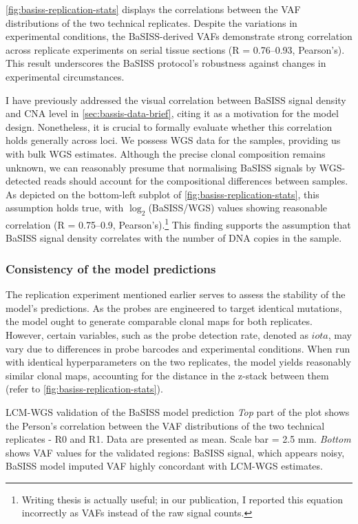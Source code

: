 \cref{fig:basiss-replication-stats} displays the correlations between the \ac{VAF} distributions of the two technical replicates. Despite the variations in experimental conditions, the \ac{BaSISS}-derived \ac{VAF}s demonstrate strong correlation across replicate experiments on serial tissue sections (R = 0.76–0.93, Pearson's). This result underscores the \ac{BaSISS} protocol's robustness against changes in experimental circumstances.

I have previously addressed the visual correlation between \ac{BaSISS} signal density and \ac{CNA} level in \cref{sec:bassis-data-brief}, citing it as a motivation for the model design. Nonetheless, it is crucial to formally evaluate whether this correlation holds generally across loci. We possess \ac{WGS} data for the samples, providing us with bulk \ac{WGS} estimates. Although the precise clonal composition remains unknown, we can reasonably presume that normalising \ac{BaSISS} signals by \ac{WGS}-detected reads should account for the compositional differences between samples. As depicted on the bottom-left subplot of \cref{fig:basiss-replication-stats}, this assumption holds true, with $\log_2$(BaSISS/WGS) values showing reasonable correlation (R = 0.75–0.9, Pearson’s).\footnote{Writing thesis is actually useful; in our publication, I reported this equation incorrectly as \ac{VAF}s instead of the raw signal counts.} This finding supports the assumption that \ac{BaSISS} signal density correlates with the number of DNA copies in the sample.

\subsubsection*{Consistency of the model predictions}
The replication experiment mentioned earlier serves to assess the stability of the model's predictions. As the probes are engineered to target identical mutations, the model ought to generate comparable clonal maps for both replicates. However, certain variables, such as the probe detection rate, denoted as $iota$, may vary due to differences in probe barcodes and experimental conditions. When run with identical hyperparameters on the two replicates, the model yields reasonably similar clonal maps, accounting for the distance in the z-stack between them (refer to \cref{fig:basiss-replication-stats}).

    {\ac{LCM}-\ac{WGS} validation of the \ac{BaSISS} model prediction}
    {\emph{Top} part of the plot shows the Person's correlation between the \ac{VAF} distributions of the two technical replicates - R0 and R1. Data are presented as mean. Scale bar = 2.5 mm. \emph{Bottom} shows \ac{VAF} values for the validated regions: \ac{BaSISS} signal, which appears noisy, \ac{BaSISS} model imputed \ac{VAF} highly concordant with \ac{LCM}-\ac{WGS} estimates.}

